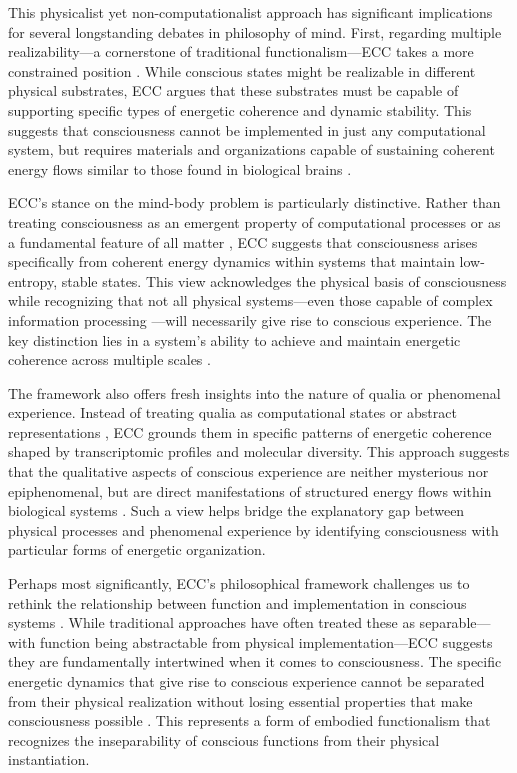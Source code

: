 This physicalist yet non-computationalist approach has significant implications for several longstanding debates in philosophy of mind. First, regarding multiple realizability—a cornerstone of traditional functionalism—ECC takes a more constrained position \cite{piccinini2013neural, anderson2024physical}. While conscious states might be realizable in different physical substrates, ECC argues that these substrates must be capable of supporting specific types of energetic coherence and dynamic stability. This suggests that consciousness cannot be implemented in just any computational system, but requires materials and organizations capable of sustaining coherent energy flows similar to those found in biological brains \cite{van1995might}.

ECC's stance on the mind-body problem is particularly distinctive. Rather than treating consciousness as an emergent property of computational processes \cite{piccinini2020neurocognitive} or as a fundamental feature of all matter \cite{Goff2019}, ECC suggests that consciousness arises specifically from coherent energy dynamics within systems that maintain low-entropy, stable states. This view acknowledges the physical basis of consciousness while recognizing that not all physical systems—even those capable of complex information processing \cite{tononi2016integrated}—will necessarily give rise to conscious experience. The key distinction lies in a system's ability to achieve and maintain energetic coherence across multiple scales \cite{horst2011symbols}.

The framework also offers fresh insights into the nature of qualia or phenomenal experience. Instead of treating qualia as computational states or abstract representations \cite{bishop2009computers}, ECC grounds them in specific patterns of energetic coherence shaped by transcriptomic profiles and molecular diversity. This approach suggests that the qualitative aspects of conscious experience are neither mysterious nor epiphenomenal, but are direct manifestations of structured energy flows within biological systems \cite{noe2009out}. Such a view helps bridge the explanatory gap between physical processes and phenomenal experience by identifying consciousness with particular forms of energetic organization.

Perhaps most significantly, ECC's philosophical framework challenges us to rethink the relationship between function and implementation in conscious systems \cite{piccinini2013neural}. While traditional approaches have often treated these as separable—with function being abstractable from physical implementation—ECC suggests they are fundamentally intertwined when it comes to consciousness. The specific energetic dynamics that give rise to conscious experience cannot be separated from their physical realization without losing essential properties that make consciousness possible \cite{van1995might}. This represents a form of embodied functionalism that recognizes the inseparability of conscious functions from their physical instantiation.

